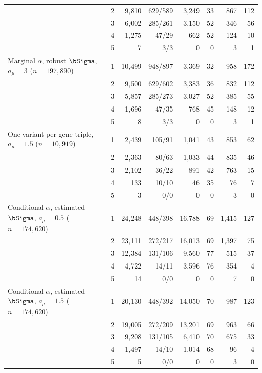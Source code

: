 {\begin{longtable}{l c rr rr rr}
 & 2 & 9{,}810 & 629/589 & 3{,}249 & 33 & 867 & 112\\
 & 3 & 6{,}002 & 285/261 & 3{,}150 & 52 & 346 & 56\\
 & 4 & 1{,}275 & 47/29 & 662 & 52 & 124 & 10\\
 & 5 & 7 & 3/3 & 0 & 0 & 3 & 1\\
\midrule
Marginal $\alpha$, robust $\bSigma$, $a_\mu=3$ ($n=197{,}890$) & 1 & 10{,}499 & 948/897 & 3{,}369 & 32 & 958 & 172\\
 & 2 & 9{,}500 & 629/602 & 3{,}383 & 36 & 832 & 112\\
 & 3 & 5{,}857 & 285/273 & 3{,}027 & 52 & 385 & 55\\
 & 4 & 1{,}696 & 47/35 & 768 & 45 & 148 & 12\\
 & 5 & 8 & 3/3 & 0 & 0 & 3 & 1\\
\midrule
One variant per gene triple, $a_\mu=1.5$ ($n=10{,}919$) & 1 & 2{,}439 & 105/91 & 1{,}041 & 43 & 853 & 62\\
 & 2 & 2{,}363 & 80/63 & 1{,}033 & 44 & 835 & 46\\
 & 3 & 2{,}102 & 36/22 & 891 & 42 & 763 & 15\\
 & 4 & 133 & 10/10 & 46 & 35 & 76 & 7\\
 & 5 & 3 & 0/0 & 0 & 0 & 3 & 0\\
\midrule
Conditional $\alpha$, estimated $\bSigma$, $a_\mu=0.5$ ($n=174{,}620$) & 1 & 24{,}248 & 448/398 & 16{,}788 & 69 & 1{,}415 & 127\\
 & 2 & 23{,}111 & 272/217 & 16{,}013 & 69 & 1{,}397 & 75\\
 & 3 & 12{,}384 & 131/106 & 9{,}560 & 77 & 515 & 37\\
 & 4 & 4{,}722 & 14/11 & 3{,}596 & 76 & 354 & 4\\
 & 5 & 14 & 0/0 & 0 & 0 & 7 & 0\\
\midrule
Conditional $\alpha$, estimated $\bSigma$, $a_\mu=1.5$ ($n=174{,}620$) & 1 & 20{,}130 & 448/392 & 14{,}050 & 70 & 987 & 123\\
 & 2 & 19{,}005 & 272/209 & 13{,}201 & 69 & 963 & 66\\
 & 3 & 9{,}208 & 131/105 & 6{,}410 & 70 & 675 & 33\\
 & 4 & 1{,}497 & 14/10 & 1{,}014 & 68 & 96 & 4\\
 & 5 & 5 & 0/0 & 0 & 0 & 3 & 0\\
\end{longtable}}
